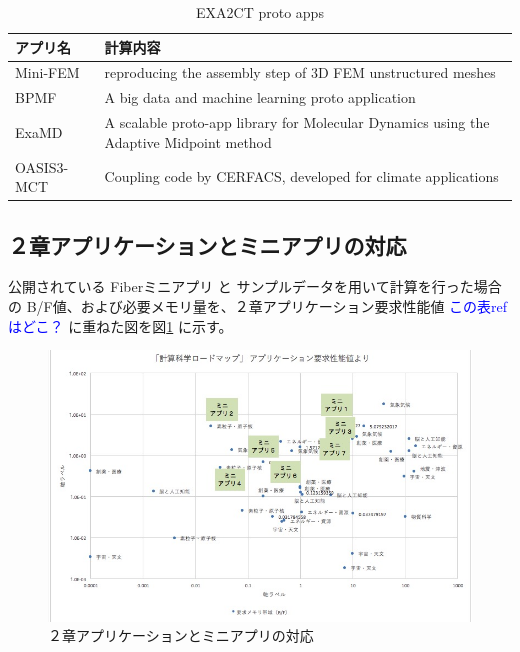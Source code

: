 \begin{table}[H]
\caption{EXA2CT proto apps}
\label{tab:exa2ct-proto-apps}
{
\begin{tabular}{p{50mm}|p{100mm}} \hline
アプリ名		&	計算内容 \\ \hline
\hline
Mini-FEM & reproducing the assembly step of 3D FEM unstructured meshes \\ \hline
BPMF	& A big data and machine learning proto application \\ \hline
ExaMD	& A scalable proto-app library for Molecular Dynamics using
			the Adaptive Midpoint method  \\ \hline
OASIS3-MCT & Coupling code by CERFACS, developed for climate applications
\\ \hline
\end{tabular}
}
\end{table}

\subsection{２章アプリケーションとミニアプリの対応}
\label{sec:apps-and-miniapps}

公開されている Fiberミニアプリ と サンプルデータを用いて計算を行った場合の
B/F値、および必要メモリ量を、２章アプリケーション要求性能値
{\textcolor{blue}{この表refはどこ？}} %
に重ねた図を図\ref{fig:apps-miniapps} に示す。

\begin{figure}[h]
\includegraphics[width=\textwidth]{figs/3-2-miniapps.jpg}
\caption{２章アプリケーションとミニアプリの対応}
\label{fig:apps-miniapps}
\end{figure}


\nocite{*}




